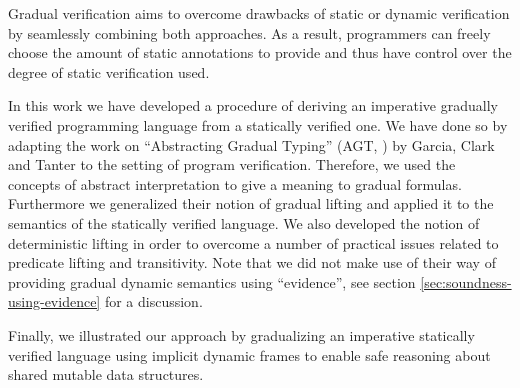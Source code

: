 Gradual verification aims to overcome drawbacks of static or dynamic verification by seamlessly combining both approaches.
As a result, programmers can freely choose the amount of static annotations to provide and thus have control over the degree of static verification used.

In this work we have developed a procedure of deriving an imperative gradually verified programming language from a statically verified one.
We have done so by adapting the work on “Abstracting Gradual Typing” (AGT, \cite{garcia2016abstracting}) by Garcia, Clark and Tanter to the setting of program verification.
Therefore, we used the concepts of abstract interpretation to give a meaning to gradual formulas.
Furthermore we generalized their notion of gradual lifting and applied it to the semantics of the statically verified language.
We also developed the notion of deterministic lifting in order to overcome a number of practical issues related to predicate lifting and transitivity.
Note that we did not make use of their way of providing gradual dynamic semantics using “evidence”, see section \ref{sec:soundness-using-evidence} for a discussion.

Finally, we illustrated our approach by gradualizing an imperative statically verified language using implicit dynamic frames to enable safe reasoning about shared mutable data structures.




